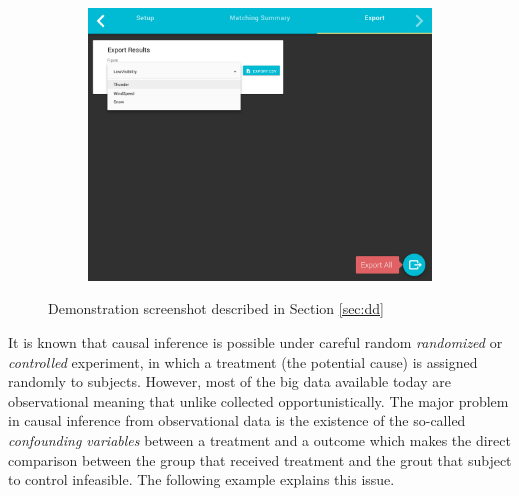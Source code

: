 \begin{figure}[t]
\begin{subfigure}{0.33\linewidth}
  \end{subfigure}\hfill
  \begin{subfigure}{0.33\linewidth}
    \centering
    \hspace{-.6cm}
    \includegraphics[scale=0.13]{Figures/Export.png}
    \caption{\scriptsize }
    \label{sfig:testcc}
  \end{subfigure}\hfill
\caption{Demonstration screenshot described in Section \ref{sec:dd}}
\label{fig:inteface}
\vspace{-0.3cm}
\end{figure}


It is known that causal inference is possible under careful random \emph{randomized} or \emph{controlled} experiment, in which a treatment (the potential cause) is assigned randomly to subjects. However, most of the big data available today are observational meaning that unlike collected opportunistically. The major problem in causal inference from observational data is the existence of the so-called {\em confounding variables} between a treatment and a outcome which makes the direct comparison between the group that received treatment and the grout that subject to control infeasible. The following example explains this issue.



